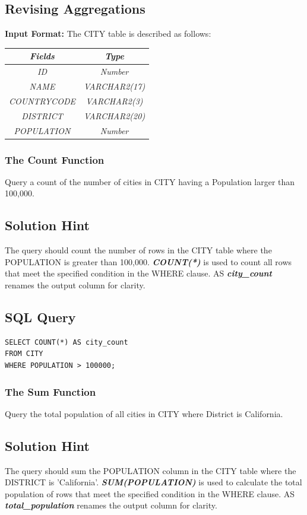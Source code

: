 \documentclass[12pt,a4paper]{article}
\renewcommand{\arraystretch}{1.5} %
\begin{document}
\subsection{Revising Aggregations}
\textbf{Input Format:}
The CITY table is described as follows:
\begin{table}[H]
\renewcommand{\arraystretch}{1.3}
\begin{tabular}{|c|c|}
\hline
\textit{Fields} & \textit{Type} \\ \hline
\textit{ID} & \textit{Number} \\ \hline
\textit{NAME} & \textit{VARCHAR2(17)} \\ \hline
\textit{COUNTRYCODE} & \textit{VARCHAR2(3)} \\ \hline
\textit{DISTRICT} & \textit{VARCHAR2(20)} \\ \hline
\textit{POPULATION} & \textit{Number} \\ \hline
\end{tabular}
\end{table}
\subsubsection{The Count Function}
Query a count of the number of cities in CITY having a Population larger than 100,000.
\subsection*{Solution Hint}
The query should count the number of rows in the CITY table where the POPULATION is greater than 100,000.
\newline
\textit{\textbf{COUNT(*)}} is used to count all rows that meet the specified condition in the WHERE clause.
AS \textit{\textbf{city\_count}} renames the output column for clarity.
\subsection*{SQL Query}
\begin{lstlisting}[style=sqlstyle]
SELECT COUNT(*) AS city_count
FROM CITY
WHERE POPULATION > 100000;
\end{lstlisting}
\subsubsection{The Sum Function}
Query the total population of all cities in CITY where District is California.
\subsection*{Solution Hint}
The query should sum the POPULATION column in the CITY table where the DISTRICT is 'California'.
\newline
\textit{\textbf{SUM(POPULATION)}} is used to calculate the total population of rows that meet the specified condition in the WHERE clause.
AS \textit{\textbf{total\_population}} renames the output column for clarity.
\end{document}
